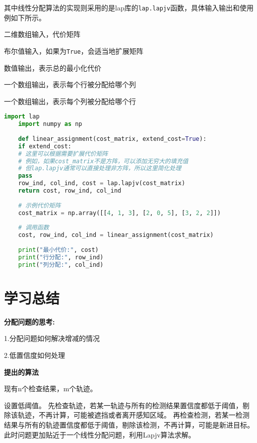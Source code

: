 其中线性分配算法的实现则采用的是lap库的\texttt{lap.lapjv}函数，具体输入输出和使用例如下所示。

\begin{description}[itemsep=-3pt,parsep=0pt,topsep=3pt]
	\item[cost\_matrix] 二维数组输入，代价矩阵
	\item[extend\_cost] 布尔值输入，如果为\texttt{True}，会适当地扩展矩阵
	\item[const] 数值输出，表示总的最小化代价
	\item[x] 一个数组输出，表示每个行被分配给哪个列
	\item[y] 一个数组输出，表示每个列被分配给哪个行
\end{description}


\begin{lstlisting}[language=Python, caption={lapjv example}, label={lst:pythonfile}]
	import lap
	import numpy as np
	
	def linear_assignment(cost_matrix, extend_cost=True):
	if extend_cost:
	# 这里可以根据需要扩展代价矩阵
	# 例如，如果cost_matrix不是方阵，可以添加无穷大的填充值
	# 但lap.lapjv通常可以直接处理非方阵，所以这里简化处理
	pass
	row_ind, col_ind, cost = lap.lapjv(cost_matrix)
	return cost, row_ind, col_ind
	
	# 示例代价矩阵
	cost_matrix = np.array([[4, 1, 3], [2, 0, 5], [3, 2, 2]])
	
	# 调用函数
	cost, row_ind, col_ind = linear_assignment(cost_matrix)
	
	print("最小代价:", cost)
	print("行分配:", row_ind)
	print("列分配:", col_ind)
\end{lstlisting}





\section{学习总结}
\textbf{分配问题的思考:}

1.分配问题如何解决增减的情况

2.低置信度如何处理

\textbf{提出的算法}

现有n个检查结果，m个轨迹。

设置低阈值。
先检查轨迹，若某一轨迹与所有的检测结果置信度都低于阈值，剔除该轨迹，不再计算，可能被遮挡或者离开感知区域。
再检查检测，若某一检测结果与所有的轨迹置信度都低于阈值，剔除该检测，不再计算，可能是新进目标。
此时问题更加贴近于一个线性分配问题，利用Lapjv算法求解。

